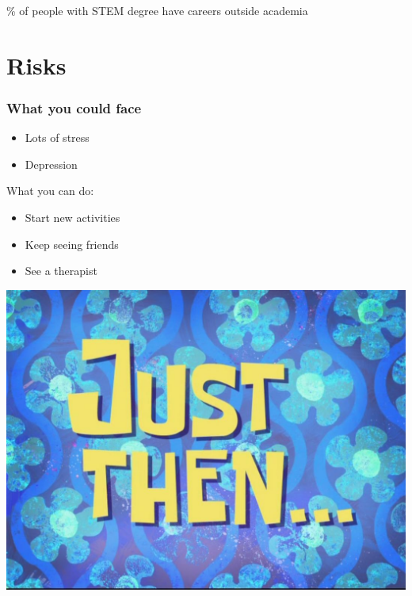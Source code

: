 \documentclass[]{beamer}
\begin{document}
\begin{frame}
\% of people with STEM degree have careers outside academia
\end{frame}

\section{Risks}
\begin{frame}
\frametitle{What you could face}
\begin{itemize}
\item Lots of stress
\item Depression
\end{itemize}\pause
What you can do:
\begin{itemize}
\item Start new activities
\item Keep seeing friends
\item See a therapist
\end{itemize}
\end{frame}

\begin{frame}
\centering
\includegraphics[width=\textwidth]{just_then}
\end{frame}
\end{document}
